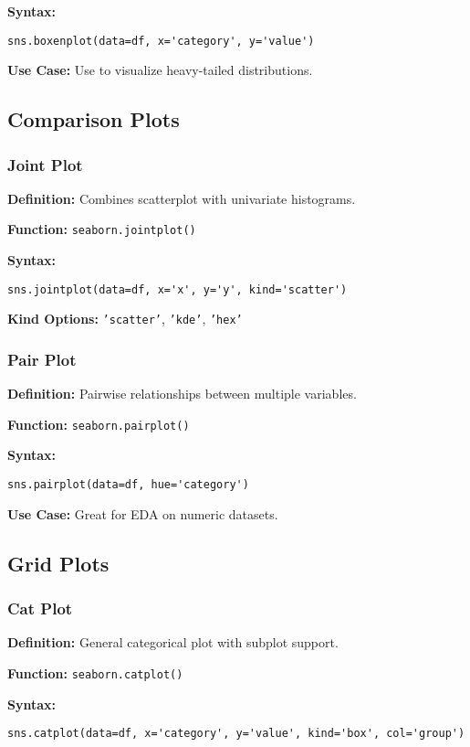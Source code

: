 \textbf{Syntax:}
\begin{verbatim}
sns.boxenplot(data=df, x='category', y='value')
\end{verbatim}

\textbf{Use Case:} Use to visualize heavy-tailed distributions.

\subsection{Comparison Plots}

\subsubsection{Joint Plot}
\textbf{Definition:} Combines scatterplot with univariate histograms.

\textbf{Function:} \texttt{seaborn.jointplot()}

\textbf{Syntax:}
\begin{verbatim}
sns.jointplot(data=df, x='x', y='y', kind='scatter')
\end{verbatim}

\textbf{Kind Options:} \texttt{'scatter'}, \texttt{'kde'}, \texttt{'hex'}

\subsubsection{Pair Plot}
\textbf{Definition:} Pairwise relationships between multiple variables.

\textbf{Function:} \texttt{seaborn.pairplot()}

\textbf{Syntax:}
\begin{verbatim}
sns.pairplot(data=df, hue='category')
\end{verbatim}

\textbf{Use Case:} Great for EDA on numeric datasets.

\subsection{Grid Plots}

\subsubsection{Cat Plot}
\textbf{Definition:} General categorical plot with subplot support.

\textbf{Function:} \texttt{seaborn.catplot()}

\textbf{Syntax:}
\begin{verbatim}
sns.catplot(data=df, x='category', y='value', kind='box', col='group')
\end{verbatim}

